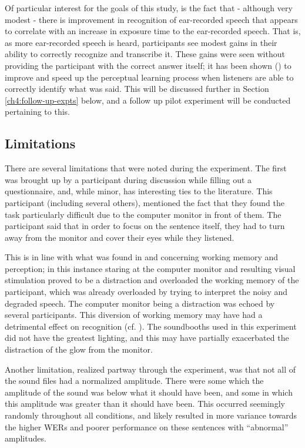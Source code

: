 \documentclass[dissertation,copyright]{uathesis}
\begin{document}
Of particular interest for the goals of this study, is the fact that - although very modest - there is improvement in recognition of ear-recorded speech that appears to correlate with an increase in exposure time to the ear-recorded speech.  That is, as more ear-recorded speech is heard, participants see modest gains in their ability to correctly recognize and transcribe it.  These gains were seen without providing the participant with the correct answer itself; it has been shown (\cite{davis:05}) to improve and speed up the perceptual learning process when listeners are able to correctly identify what was said.  This will be discussed further in Section \ref{ch4:follow-up-expts} below, and a follow up pilot experiment will be conducted pertaining to this.


\subsection{Limitations}

There are several limitations that were noted during the experiment.  The first was brought up by a participant during discussion while filling out a questionnaire, and, while minor, has interesting ties to the literature.  This participant (including several others), mentioned the fact that they found the task particularly difficult due to the computer monitor in front of them.  The participant said that in order to focus on the sentence itself, they had to turn away from the monitor and cover their eyes while they listened.

This is in line with what was found in \cite{francis:09} and \cite{francis:10} concerning working memory and perception; in this instance staring at the computer monitor and resulting visual stimulation proved to be a distraction and overloaded the working memory of the participant, which was already overloaded by trying to interpret the noisy and degraded speech.  The computer monitor being a distraction was echoed by several participants.  This diversion of working memory may have had a detrimental effect on recognition (cf. \cite{caplan:99}).  The soundbooths used in this experiment did not have the greatest lighting, and this may have partially exacerbated the distraction of the glow from the monitor.

Another limitation, realized partway through the experiment, was that not all of the sound files had a normalized amplitude.  There were some which the amplitude of the sound was below what it should have been, and some in which this amplitude was greater than it should have been.  This occurred seemingly randomly throughout all conditions, and likely resulted in more variance towards the higher WERs and poorer performance on these sentences with ``abnormal'' amplitudes.
\end{document}
